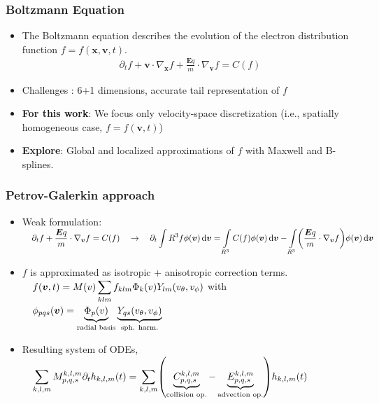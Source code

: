 \documentclass[mathserif, aspectratio=169]{beamer}
\newcommand{\ud}{\,\mathrm{d}}
\newcommand{\vect}[1]{\boldsymbol{#1}}
\newcommand{\of}[1]{\mleft( #1 \mright)}
\newcommand{\myint}{\int\limits}
\begin{document}
\begin{frame}
	\frametitle{Boltzmann Equation}
\begin{itemize}
	\item The Boltzmann equation describes the evolution of the electron distribution function $f=f(\vect{x}, \vect{v}, t)$. %
	\begin{align}
		\partial_t f + \vect{v}\cdot \nabla_{\vect{x}} f  + \frac{\vect{E} q}{m} \cdot \nabla_{\vect{v }}f = C(f)
	\end{align}
	\item Challenges : 6+1 dimensions, accurate tail representation of $f$
	\item \textbf{For this work}: We focus only velocity-space discretization (i.e., spatially homogeneous case, $f=f(\vect{v}, t)$) 
	\item \textbf{Explore}: Global and localized approximations of $f$ with Maxwell and B-splines. 
\end{itemize}
\end{frame}

\begin{frame}
	\frametitle{Petrov-Galerkin approach}
	\small
	\begin{itemize}
		\item Weak formulation:
		$
		\displaystyle
		\quad
		\partial_t f + \frac{\vect{E} q}{m} \cdot \nabla_{\vect{v}}f = C(f)
		\quad \rightarrow \quad
		\partial_t \myint{R^3}{} f \phi\of{\vect{v}} \ud \vect{v} = 
		\myint_{R^3} C(f) \phi\of{\vect{v}} \ud \vect{v} - \myint_{R^3} \of{\frac{\vect{E} q}{m} \cdot \nabla_{\vect{v}} f} \phi(\vect{v}) \ud\vect{v}
		$

		\item $f$ is approximated as isotropic + anisotropic correction terms.
		$
		\displaystyle
		\quad 
		f(\vect{v},t) = M(v)\sum_{klm} f_{klm} \Phi_k\of{v} Y_{lm}\of{v_\theta, v_\phi}$ with $
		\displaystyle
		\quad 
		\phi_{pqs}\of{\vect{v}} = \underbrace{\Phi_p\of{v}}_{\text{radial basis}} \underbrace{Y_{qs}\of{v_\theta, v_\phi}}_{\tiny\text{sph. harm.}}$

		\item Resulting system of ODEs, 
		$ \displaystyle
		\quad 
		\sum_{k,l,m} M_{p,q,s}^{k,l,m} \partial_t h_{k,l,m}\of{t} = \sum_{k,l,m}  \of{\underbrace{C_{p,q,s}^{k,l,m}}_{\text{collision op.}}  - \underbrace{E_{p,q,s}^{k,l,m}}_{\text{advection op.}}} h_{k,l,m}\of{t}$
	\end{itemize}
\end{frame}
\end{document}
